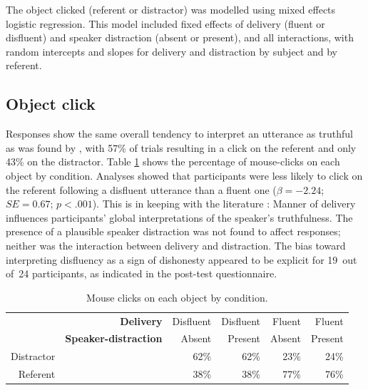 \documentclass[a4paper,man,natbib]{apa6}
\newcommand*{\SE}{\mathit{SE}} %
\begin{document}
The object clicked (referent or distractor) was modelled using mixed effects logistic regression.
This model included  fixed effects of delivery (fluent or disfluent) and speaker distraction (absent or present), and all interactions, with random intercepts and slopes for delivery and distraction by subject and by referent.

\subsection{Object click}
Responses show the same overall tendency to interpret an utterance as truthful as was found by \citet{Loy2016}, with 57\% of trials resulting in a click on the referent and only 43\% on the distractor.
Table \ref{table:objctclck} shows the percentage of mouse-clicks on each object by condition.
Analyses showed that participants were less likely to click on the referent following a disfluent utterance than a fluent one ($\beta = -2.24$; $\SE = 0.67$; $p<.001$). 
This is in keeping with the literature \citep{depaulo2003cues,Zuckerman1981}:
Manner of delivery influences participants' global interpretations of the speaker's truthfulness. 
The presence of a plausible speaker distraction was not found to affect responses; neither was the interaction between delivery and distraction. 
The bias toward interpreting disfluency as a sign of dishonesty appeared to be explicit for 19~out of~24 participants, as indicated in the post-test questionnaire. 



\begin{table}[ht]
\centering
\begin{tabular}{rrrrrr}
  \hline
& \textbf{Delivery} & Disfluent & Disfluent & Fluent & Fluent \\ 
& \textbf{Speaker-distraction} & Absent & Present & Absent & Present \\
  \hline
Distractor & &  62\% &  62\% &  23\% &  24\% \\ 
  Referent & &  38\% &  38\% &  77\% &  76\% \\ 
   \hline
\end{tabular}
\caption{Mouse clicks on each object by condition.}
\label{table:objctclck}
\end{table}

\end{document}
